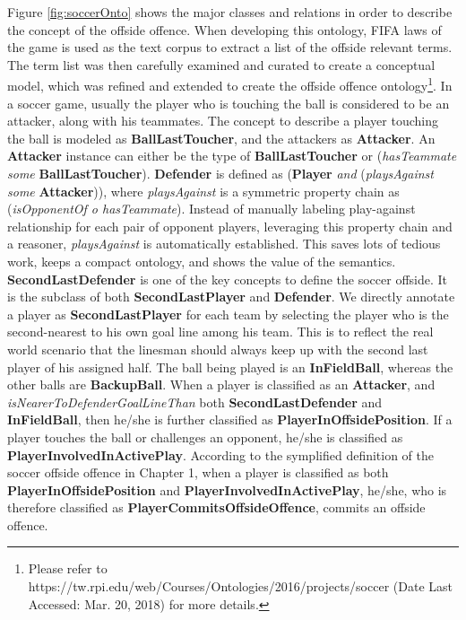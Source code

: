 Figure \ref{fig:soccerOnto} shows the major classes and relations in order to describe the concept of the offside offence.
When developing this ontology, FIFA laws of the game \cite{federation2016laws} is used as the text corpus to extract a list of the offside relevant terms.
The term list was then carefully examined and curated to create a conceptual model, which was refined and extended to create the offside offence ontology\footnote{Please refer to https://tw.rpi.edu/web/Courses/Ontologies/2016/projects/soccer (Date Last Accessed: Mar. 20, 2018) for more details.}.
In a soccer game, usually the player who is touching the ball is considered to be an attacker, along with his teammates.
The concept to describe a player touching the ball is modeled as \textbf{BallLastToucher}, and the attackers as \textbf{Attacker}. 
An \textbf{Attacker} instance can either be the type of \textbf{BallLastToucher} or (\textit{hasTeammate some} \textbf{BallLastToucher}).
\textbf{Defender} is defined as (\textbf{Player} \textit{and} (\textit{playsAgainst some} \textbf{Attacker})),
where \textit{playsAgainst} is a symmetric property chain as (\textit{isOpponentOf o hasTeammate}).
Instead of manually labeling play-against relationship for each pair of opponent players, leveraging this property chain and a reasoner, \textit{playsAgainst} is automatically established.
This saves lots of tedious work, keeps a compact ontology, and shows the value of the semantics.
\textbf{SecondLastDefender} is one of the key concepts to define the soccer offside.
It is the subclass of both \textbf{SecondLastPlayer} and \textbf{Defender}.
We directly annotate a player as \textbf{SecondLastPlayer} for each team by selecting the player who is the second-nearest to his own goal line among his team. 
This is to reflect the real world scenario that the linesman should always keep up with the second last player of his assigned half.
The ball being played is an \textbf{InFieldBall}, whereas the other balls are \textbf{BackupBall}.
When a player is classified as an \textbf{Attacker}, and \textit{isNearerToDefenderGoalLineThan} both \textbf{SecondLastDefender} and \textbf{InFieldBall}, then he/she is further classified as \textbf{PlayerInOffsidePosition}.
If a player touches the ball or challenges an opponent, he/she is classified as \textbf{PlayerInvolvedInActivePlay}.
According to the symplified definition of the soccer offside offence in Chapter 1, when a player is classified as both \textbf{PlayerInOffsidePosition} and \textbf{PlayerInvolvedInActivePlay}, he/she, who is therefore classified as \textbf{PlayerCommitsOffsideOffence}, commits an offside offence.


